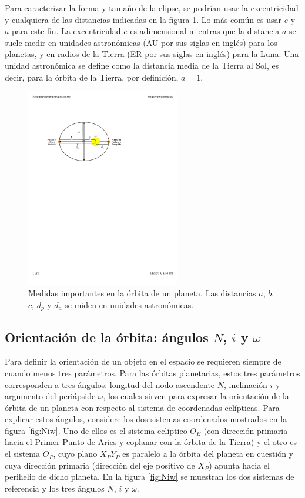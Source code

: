 \documentclass[a4paper,10pt]{article}
\begin{document}
Para caracterizar la forma y tamaño de la elipse, se podrían usar la excentricidad y cualquiera de las distancias indicadas en la figura \ref{fig:Ellipse}. Lo más común es usar $e$ y $a$ para este fin. La excentricidad $e$ es adimensional mientras que la distancia $a$ se suele medir en unidades astronómicas (AU por sus siglas en inglés) para los planetas, y en radios de la Tierra (ER por sus siglas en inglés) para la Luna. Una unidad astronómica se define como la distancia media de la Tierra al Sol, es decir, para la órbita de la Tierra, por definición, $a=1$.
\begin{figure}
  \centering
  \includegraphics[width=0.6\textwidth]{Figures/EccentricitySemimajorAxis.pdf}
  \caption{Medidas importantes en la órbita de un planeta. Las distancias $a$, $b$, $c$, $d_p$ y $d_a$ se miden en unidades astronómicas.}
  \label{fig:Ellipse}
\end{figure}

\subsection{Orientación de la órbita: ángulos $N$, $i$ y $\omega$}
\label{sec:NiwAngles}
Para definir la orientación de un objeto en el espacio se requieren siempre de cuando menos tres parámetros. Para las órbitas planetarias, estos tres parámetros corresponden a tres ángulos: longitud del nodo ascendente $N$, inclinación $i$ y argumento del periápside $\omega$, los cuales sirven para expresar la orientación de la órbita de un planeta con respecto al sistema de coordenadas eclípticas. Para explicar estos ángulos, considere los dos sistemas coordenados mostrados en la figura \ref{fig:Niw}. Uno de ellos es el sistema eclíptico $O_E$ (con dirección primaria hacia el Primer Punto de Aries y coplanar con la órbita de la Tierra) y el otro es el sistema $O_P$, cuyo plano $X_P Y_P$ es paralelo a la órbita del planeta en cuestión y cuya dirección primaria (dirección del eje positivo de $X_P$) apunta hacia el perihelio de dicho planeta. En la figura \ref{fig:Niw} se muestran los dos sistemas de referencia y los tres ángulos $N$, $i$ y $\omega$.
\end{document}
